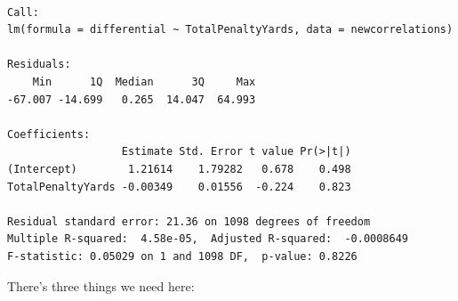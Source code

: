 \documentclass[
  letterpaper,
  DIV=11,
  numbers=noendperiod]{scrreprt}
\begin{document}
\begin{verbatim}

Call:
lm(formula = differential ~ TotalPenaltyYards, data = newcorrelations)

Residuals:
    Min      1Q  Median      3Q     Max 
-67.007 -14.699   0.265  14.047  64.993 

Coefficients:
                  Estimate Std. Error t value Pr(>|t|)
(Intercept)        1.21614    1.79282   0.678    0.498
TotalPenaltyYards -0.00349    0.01556  -0.224    0.823

Residual standard error: 21.36 on 1098 degrees of freedom
Multiple R-squared:  4.58e-05,  Adjusted R-squared:  -0.0008649 
F-statistic: 0.05029 on 1 and 1098 DF,  p-value: 0.8226
\end{verbatim}

There's three things we need here:
\end{document}
